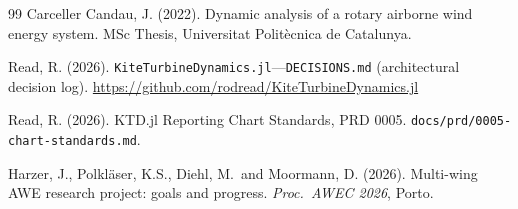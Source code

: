 \documentclass[11pt,a4paper]{article}
\begin{document}
\begin{thebibliography}{99}
Carceller Candau, J. (2022).
Dynamic analysis of a rotary airborne wind energy system.
MSc Thesis, Universitat Polit\`ecnica de Catalunya.

Read, R. (2026).
\texttt{KiteTurbineDynamics.jl}---\texttt{DECISIONS.md} (architectural decision log).
\url{https://github.com/rodread/KiteTurbineDynamics.jl}

Read, R. (2026).
KTD.jl Reporting Chart Standards, PRD 0005.
\texttt{docs/prd/0005-chart-standards.md}.

Harzer, J., Polkl\"aser, K.S., Diehl, M.\ and Moormann, D. (2026).
Multi-wing AWE research project: goals and progress.
\emph{Proc.\ AWEC 2026}, Porto.

\end{thebibliography}
\end{document}

